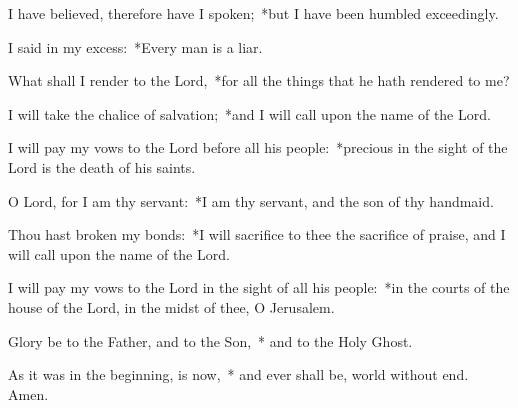 \begin{enpars}
\item I have believed, therefore have I spoken;~*but I have been humbled exceedingly.
\item I said in my excess:~*Every man is a liar.
\item What shall I render to the Lord,~*for all the things that he hath rendered to me?
\item I will take the chalice of salvation;~*and I will call upon the name of the Lord.
\item I will pay my vows to the Lord before all his people:~*precious in the sight of the Lord is the death of his saints.
\item O Lord, for I am thy servant:~*I am thy servant, and the son of thy handmaid.
\item Thou hast broken my bonds:~*I will sacrifice to thee the sacrifice of praise, and I will call upon the name of the Lord.
\item I will pay my vows to the Lord in the sight of all his people:~*in the courts of the house of the Lord, in the midst of thee, O Jerusalem.
\item Glory be to the Father, and to the Son,~* and to the Holy Ghost. 
\item As it was in the beginning, is now,~* and ever shall be, world without end. Amen.
\end{enpars}

